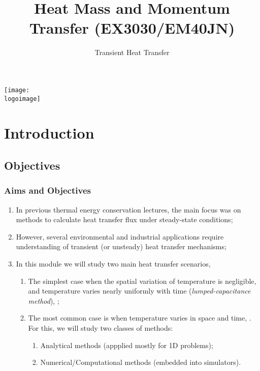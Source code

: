 \documentclass[10pt,compress,handout,ignorenonframetext,unknownkeysallowed]{beamer}
\institute{School of Engineering}
\title{Heat Mass and Momentum Transfer (EX3030/EM40JN)}
\subtitle{Transient Heat Transfer}
\date[ ]{ }
\newcommand{\logoimage}{../FigBanner/UoAHorizBanner}
\begin{document}
\begin{frame}
  \titlepage
  \vfill%
  \begin{center}
    \texttt{[image: \\logoimage]}
  \end{center}
\end{frame}




\section{Introduction} 


\subsection{Objectives}

\begin{frame}
 \frametitle{Aims and Objectives}
   \begin{enumerate}
     \item<1-> In previous thermal energy conservation lectures, the main focus was on methods to calculate heat transfer flux under steady-state conditions;
     \item<1-> However, several environmental and industrial applications require understanding of transient (or unsteady) heat transfer mechanisms;
     \item<2-> In this module we will study two main heat transfer scenarios,
         \begin{enumerate}
            \item<2-> The simplest case when the spatial variation of temperature is negligible, and temperature varies nearly uniformly with time ({\it lumped-capacitance method}), \ie {};
            \item<3-> The most common case is when temperature varies in space and time, \ie {}. For this, we will study two classes of methods:
              \begin{enumerate}
                 \item<4-> Analytical methods (appplied mostly for 1D problems);
                 \item<5-> Numerical/Computational methods (embedded into simulators). 
              \end{enumerate}
         \end{enumerate}
   \end{enumerate}
\end{frame}
\end{document}
